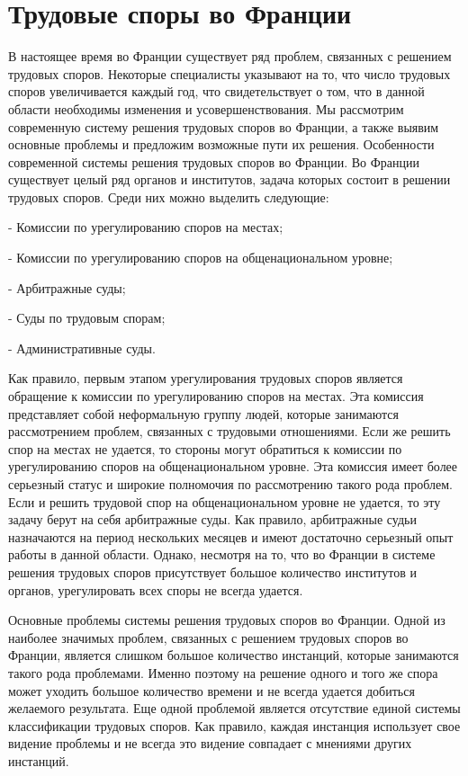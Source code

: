 \section{Трудовые споры во Франции}
В настоящее время во Франции существует ряд проблем, связанных с решением трудовых споров. Некоторые специалисты указывают на то, что число трудовых споров увеличивается каждый год, что свидетельствует о том, что в данной области необходимы изменения и усовершенствования. Мы рассмотрим современную систему решения трудовых споров во Франции, а также выявим основные проблемы и предложим возможные пути их решения. Особенности современной системы решения трудовых споров во Франции. Во Франции существует целый ряд органов и институтов, задача которых состоит в решении трудовых споров. Среди них можно выделить следующие: 

- Комиссии по урегулированию споров на местах; 

- Комиссии по урегулированию споров на общенациональном уровне;

- Арбитражные суды; 

- Суды по трудовым спорам; 

- Административные суды. 

Как правило, первым этапом урегулирования трудовых споров является обращение к комиссии по урегулированию споров на местах. Эта комиссия представляет собой неформальную группу людей, которые занимаются рассмотрением проблем, связанных с трудовыми отношениями. Если же решить спор на местах не удается, то стороны могут обратиться к комиссии по урегулированию споров на общенациональном уровне. Эта комиссия имеет более серьезный статус и широкие полномочия по рассмотрению такого рода проблем. Если и решить трудовой спор на общенациональном уровне не удается, то эту задачу берут на себя арбитражные суды. Как правило, арбитражные судьи назначаются на период нескольких месяцев и имеют достаточно серьезный опыт работы в данной области. Однако, несмотря на то, что во Франции в системе решения трудовых споров присутствует большое количество институтов и органов, урегулировать всех споры не всегда удается.

Основные проблемы системы решения трудовых споров во Франции. Одной из наиболее значимых проблем, связанных с решением трудовых споров во Франции, является слишком большое количество инстанций, которые занимаются такого рода проблемами. Именно поэтому на решение одного и того же спора может уходить большое количество времени и не всегда удается добиться желаемого результата. Еще одной проблемой является отсутствие единой системы классификации трудовых споров. Как правило, каждая инстанция использует свое видение проблемы и не всегда это видение совпадает с мнениями других инстанций. 

